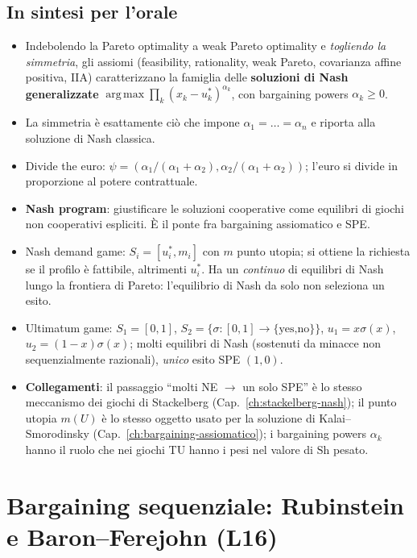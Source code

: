 \documentclass[12pt,a4paper,twoside]{book}
\theoremstyle{plain}
\theoremstyle{definition}
\newcommand{\argmax}{\operatorname*{arg\,max}}
\newcommand{\Sh}{\mathrm{Sh}}
\begin{document}
\section*{In sintesi per l'orale}
\begin{itemize}
  \item Indebolendo la Pareto optimality a weak Pareto optimality e \emph{togliendo la
        simmetria}, gli assiomi (feasibility, rationality, weak Pareto, covarianza affine
        positiva, IIA) caratterizzano la famiglia delle \textbf{soluzioni di Nash
        generalizzate} $\argmax\prod_k(x_k-u^*_k)^{\alpha_k}$, con bargaining powers
        $\alpha_k\ge0$.
  \item La simmetria è esattamente ciò che impone $\alpha_1=\dots=\alpha_n$ e riporta alla
        soluzione di Nash classica.
  \item Divide the euro: $\psi=(\alpha_1/(\alpha_1+\alpha_2),\alpha_2/(\alpha_1+\alpha_2))$;
        l'euro si divide in proporzione al potere contrattuale.
  \item \textbf{Nash program}: giustificare le soluzioni cooperative come equilibri di giochi
        non cooperativi espliciti. È il ponte fra bargaining assiomatico e SPE.
  \item Nash demand game: $S_i=[u^*_i,m_i]$ con $m$ punto utopia; si ottiene la richiesta se
        il profilo è fattibile, altrimenti $u^*_i$. Ha un \emph{continuo} di equilibri di
        Nash lungo la frontiera di Pareto: l'equilibrio di Nash da solo non seleziona un esito.
  \item Ultimatum game: $S_1=[0,1]$, $S_2=\{\sigma:[0,1]\to\{\text{yes,no}\}\}$,
        $u_1=x\sigma(x)$, $u_2=(1-x)\sigma(x)$; molti equilibri di Nash (sostenuti da minacce
        non sequenzialmente razionali), \emph{unico} esito SPE $(1,0)$.
  \item \textbf{Collegamenti}: il passaggio ``molti NE $\to$ un solo SPE'' è lo stesso
        meccanismo dei giochi di Stackelberg (Cap.~\ref{ch:stackelberg-nash}); il punto
        utopia $m(U)$ è lo stesso oggetto usato per la soluzione di Kalai--Smorodinsky
        (Cap.~\ref{ch:bargaining-assiomatico}); i bargaining powers $\alpha_k$ hanno il ruolo
        che nei giochi TU hanno i pesi nel valore di $\Sh$ pesato.
\end{itemize}


\chapter{Bargaining sequenziale: Rubinstein e Baron--Ferejohn (L16)}
\label{ch:bargaining-sequenziale}
\end{document}
